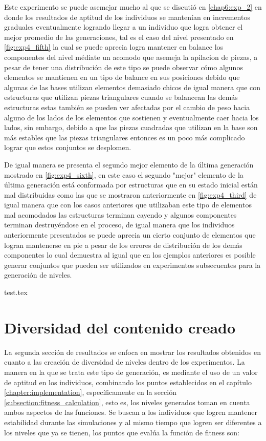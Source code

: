 Este experimento se puede asemejar mucho al que se discutió en \ref{chap6:exp_2}
en donde los resultados de aptitud de los individuos se mantenían en incrementos
graduales eventualmente logrando llegar a un individuo que logra obtener el
mejor promedio de las generaciones, tal es el caso del nivel presentado en
\ref{fig:exp4_fifth} la cual se puede aprecia logra mantener en balance los
componentes del nivel médiate un acomodo que asemeja la apilacion de piezas, a
pesar de tener una distribución de este tipo se puede observar cómo algunos
elementos se mantienen en un tipo de balance en sus posiciones debido que
algunas de las bases utilizan elementos demasiado chicos de igual manera que con
estructuras que utilizan piezas triangulares cuando se balancean las demás
estructuras estas también se pueden ver afectadas por el cambio de peso hacia
alguno de los lados de los elementos que sostienen y eventualmente caer hacia
los lados, sin embargo, debido a que las piezas cuadradas que utilizan en la base
son más estables que las piezas triangulares entonces es un poco más complicado
lograr que estos conjuntos se desplomen.

De igual manera se presenta el segundo mejor elemento de la última generación
mostrado en \ref{fig:exp4_sixth}, en este caso el segundo "mejor" elemento de la
última generación está conformada por estructuras que en su estado inicial están
mal distribuidas como las que se mostraron anteriormente en
\ref{fig:exp4_third} de igual manera que con los casos anteriores que utilizaban
este tipo de elementos mal acomodados las estructuras terminan cayendo y algunos
componentes terminan destruyéndose en el proceso, de igual manera que los
individuos anteriormente presentados se puede aprecia un cierto conjunto de
elementos que logran mantenerse en pie a pesar de los errores de distribución de
los demás componentes lo cual demuestra al igual que en los ejemplos anteriores
es posible generar conjuntos que pueden ser utilizados en experimentos
subsecuentes para la generación de niveles.

{test.tex}

\newpage

\section{Diversidad del contenido creado}
\label{section:chap6_diversity_results}

La segunda sección de resultados se enfoca en mostrar los resultados obtenidos
en cuanto a las creación de diversidad de niveles dentro de los experimentos. La
manera en la que se trata este tipo de generación, es mediante el uso de un valor
de aptitud en los individuos, combinando los puntos establecidos en el capítulo
\ref{chapter:implementation}, específicamente en la sección
\ref{subsection:fitness_calculation}, esto es, los niveles generados toman en
cuenta ambos aspectos de las funciones. Se buscan a los individuos
que logren mantener estabilidad durante las simulaciones y al mismo tiempo que
logren ser diferentes a los niveles que ya se tienen, los puntos que evalúa la función
de fitness son:

